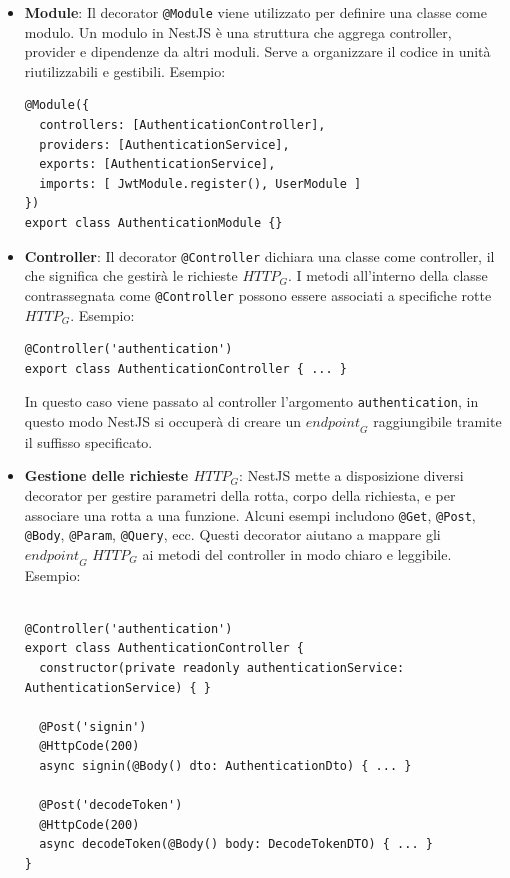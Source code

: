 \begin{itemize}
\item \textbf{Module}: Il decorator \texttt{@Module} viene utilizzato per definire una classe come modulo. Un modulo in NestJS è una struttura che aggrega controller, provider e dipendenze da altri moduli. Serve a organizzare il codice in unità riutilizzabili e gestibili. Esempio:
\begin{lstlisting}[style=ES6]
@Module({
  controllers: [AuthenticationController],
  providers: [AuthenticationService],
  exports: [AuthenticationService],
  imports: [ JwtModule.register(), UserModule ]
})
export class AuthenticationModule {}
\end{lstlisting}

\item \textbf{Controller}: Il decorator \texttt{@Controller} dichiara una classe come controller, il che significa che gestirà le richieste $\textit{HTTP}_G$. I metodi all'interno della classe contrassegnata come \texttt{@Controller} possono essere associati a specifiche rotte $\textit{HTTP}_G$. Esempio:
\begin{lstlisting}[style=ES6]
@Controller('authentication')
export class AuthenticationController { ... }
\end{lstlisting}

In questo caso viene passato al controller l'argomento \texttt{authentication}, in questo modo NestJS si occuperà di creare un $\textit{endpoint}_G$ raggiungibile tramite il suffisso specificato.
\item \textbf{Gestione delle richieste $\textit{HTTP}_G$}: NestJS mette a disposizione diversi decorator per gestire parametri della rotta, corpo della richiesta, e per associare una rotta a una funzione. Alcuni esempi includono \texttt{@Get}, \texttt{@Post}, \texttt{@Body}, \texttt{@Param}, \texttt{@Query}, ecc. Questi decorator aiutano a mappare gli $\textit{endpoint}_G$ $\textit{HTTP}_G$ ai metodi del controller in modo chiaro e leggibile. Esempio:

\begin{lstlisting}[style=ES6]

@Controller('authentication')
export class AuthenticationController {
  constructor(private readonly authenticationService: AuthenticationService) { }

  @Post('signin')
  @HttpCode(200)
  async signin(@Body() dto: AuthenticationDto) { ... }

  @Post('decodeToken')
  @HttpCode(200)
  async decodeToken(@Body() body: DecodeTokenDTO) { ... }
}
\end{lstlisting}


\end{itemize}
